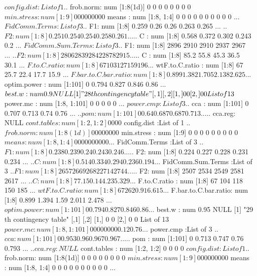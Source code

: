\documentclass[11pt]{article} %
\begin{document}
\begin{Schunk}
\begin{Soutput}
 $ config.dist         :List of 1
  ..$ frob.norm: num [1:8(1d)] 0 0 0 0 0 0 0 0
 $ min.stress          : num [1:9] 0 0 0 0 0 0 0 0 0
 $ means               : num [1:8, 1:4] 0 0 0 0 0 0 0 0 0 0 ...
 $ FidComm.Terms       :List of 3
  ..$ F1: num [1:8] 0.259 0.26 0.26 0.263 0.265 ...
  ..$ F2: num [1:8] 0.251 0.254 0.254 0.258 0.261 ...
  ..$ C : num [1:8] 0.568 0.372 0.302 0.243 0.2 ...
 $ FidComm.Sum.Terms   :List of 3
  ..$ F1: num [1:8] 2896 2910 2910 2937 2967 ...
  ..$ F2: num [1:8] 2806 2839 2842 2878 2915 ...
  ..$ C : num [1:8] 85.2 55.8 45.3 36.5 30.1 ...
 $ F.to.C.ratio        : num [1:8] 67 103 127 159 196 ...
 $ wtF.to.C.ratio      : num [1:8] 67 25.7 22.4 17.7 15.9 ...
 $ F.bar.to.C.bar.ratio: num [1:8] 0.899 1.382 1.705 2.138 2.625 ...
 $ optim.power         : num [1:101] 0 0.794 0.827 0.846 0.86 ...
 $ best.w              : num 0.9
NULL
[1] "28 th contingency table"
     [,1] [,2]
[1,]    0    0
[2,]    0    0
List of 13
 $ power.mc            : num [1:8, 1:101] 0 0 0 0 0 ...
 $ power.cmp           :List of 3
  ..$ cca    : num [1:101] 0 0.707 0.713 0.74 0.76 ...
  ..$ pom    : num [1:101] 0 0.64 0.687 0.687 0.713 ...
  ..$ cca.reg: NULL
 $ cont.tables         : num [1:2, 1:2] 0 0 0 0
 $ config.dist         :List of 1
  ..$ frob.norm: num [1:8(1d)] 0 0 0 0 0 0 0 0
 $ min.stress          : num [1:9] 0 0 0 0 0 0 0 0 0
 $ means               : num [1:8, 1:4] 0 0 0 0 0 0 0 0 0 0 ...
 $ FidComm.Terms       :List of 3
  ..$ F1: num [1:8] 0.238 0.239 0.24 0.243 0.246 ...
  ..$ F2: num [1:8] 0.224 0.227 0.228 0.231 0.234 ...
  ..$ C : num [1:8] 0.514 0.334 0.294 0.236 0.194 ...
 $ FidComm.Sum.Terms   :List of 3
  ..$ F1: num [1:8] 2657 2669 2682 2714 2744 ...
  ..$ F2: num [1:8] 2507 2534 2549 2581 2617 ...
  ..$ C : num [1:8] 77.1 50.1 44.2 35.3 29 ...
 $ F.to.C.ratio        : num [1:8] 67 104 118 150 185 ...
 $ wtF.to.C.ratio      : num [1:8] 67 26 20.9 16.6 15 ...
 $ F.bar.to.C.bar.ratio: num [1:8] 0.899 1.394 1.59 2.011 2.478 ...
 $ optim.power         : num [1:101] 0 0.794 0.827 0.846 0.86 ...
 $ best.w              : num 0.95
NULL
[1] "29 th contingency table"
     [,1] [,2]
[1,]    0    0
[2,]    0    0
List of 13
 $ power.mc            : num [1:8, 1:101] 0 0 0 0 0 0 0 0 0.12 0.76 ...
 $ power.cmp           :List of 3
  ..$ cca    : num [1:101] 0 0.953 0.96 0.967 0.967 ...
  ..$ pom    : num [1:101] 0 0.713 0.747 0.76 0.793 ...
  ..$ cca.reg: NULL
 $ cont.tables         : num [1:2, 1:2] 0 0 0 0
 $ config.dist         :List of 1
  ..$ frob.norm: num [1:8(1d)] 0 0 0 0 0 0 0 0
 $ min.stress          : num [1:9] 0 0 0 0 0 0 0 0 0
 $ means               : num [1:8, 1:4] 0 0 0 0 0 0 0 0 0 0 ...

\end{Soutput}
\end{Schunk}
\end{document}
